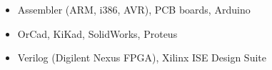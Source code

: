 \begin{itemize}
    \item Assembler (ARM, i386, AVR), PCB boards, Arduino
    \item OrCad, KiKad, SolidWorks, Proteus
    \item Verilog (Digilent Nexus FPGA), Xilinx ISE Design Suite
\end{itemize}



